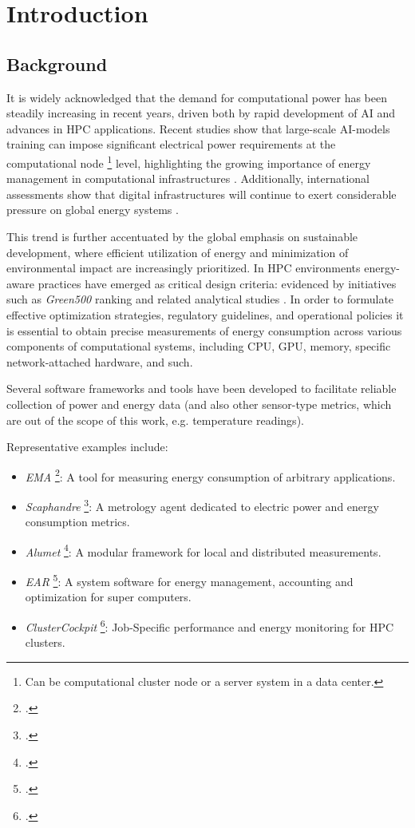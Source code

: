 \section{Introduction}

\subsection{Background}

It is widely acknowledged that the demand for computational power has
been steadily increasing in recent years, driven both by rapid development of
\gls{AI} and advances in \gls{HPC} applications. Recent studies show that
large-scale AI-models training can impose significant electrical power
requirements at the computational node \footnote{Can be computational cluster
node or a server system in a data center.} level, highlighting the growing
importance of energy management in computational infrastructures
\parencite{Latif_2025}. Additionally, international assessments show that
digital infrastructures will continue to exert considerable pressure on global
energy systems \parencite{IEA2025_AI_Energy}.

This trend is further accentuated by the global emphasis on sustainable
development, where efficient utilization of energy and minimization of
environmental impact are increasingly prioritized. In \gls{HPC} environments
energy-aware practices have emerged as critical design criteria: evidenced by
initiatives such as \emph{Green500} ranking and related analytical studies
\parencite{GreenHPC}. In order to formulate effective optimization strategies,
regulatory guidelines, and operational policies it is essential to obtain
precise measurements of energy consumption across various components of
computational systems, including \gls{CPU}, \gls{GPU}, memory, specific
network-attached hardware, and such.

Several software frameworks and tools have been developed to facilitate
reliable collection of power and energy data (and also other sensor-type
metrics, which are out of the scope of this work, e.g. temperature readings).

Representative examples include:
\begin{itemize}
  \item \emph{EMA} \footcite{EMA_git}: A tool for measuring energy consumption
    of arbitrary applications.
  \item \emph{Scaphandre} \footcite{Scaphandre}: A metrology agent dedicated
    to electric power and energy consumption metrics.
  \item \emph{Alumet} \footcite{Alumet}: A modular framework for local and
    distributed measurements.
  \item \emph{EAR} \footcite{EAR}: A system software for energy management,
    accounting and optimization for super computers. 
  \item \emph{ClusterCockpit} \footcite{ClusterCockpit}: Job-Specific
    performance and energy monitoring for \gls{HPC} clusters.
\end{itemize}

